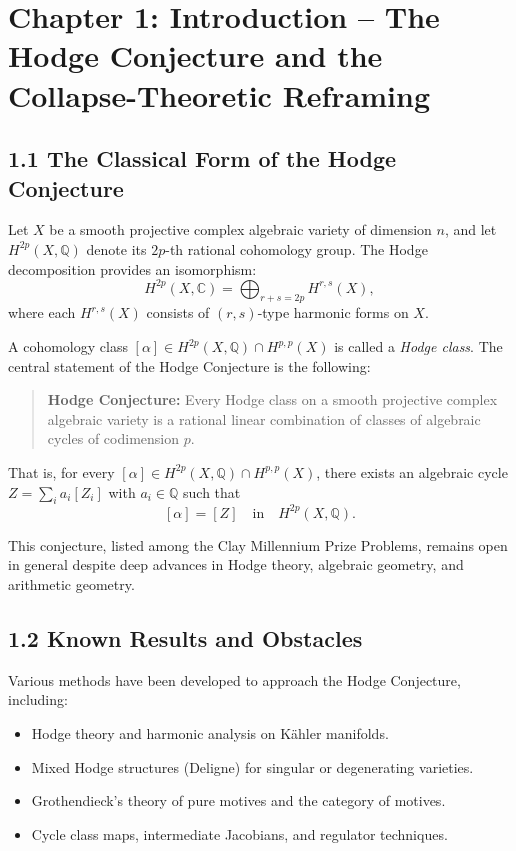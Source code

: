\documentclass[11pt]{article}
\begin{document}
\section{Chapter 1: Introduction – The Hodge Conjecture and the Collapse-Theoretic Reframing}

\subsection{1.1 The Classical Form of the Hodge Conjecture}

Let $X$ be a smooth projective complex algebraic variety of dimension $n$, and let $H^{2p}(X, \mathbb{Q})$ denote its $2p$-th rational cohomology group.  
The Hodge decomposition provides an isomorphism:
\[
H^{2p}(X, \mathbb{C}) = \bigoplus_{r+s=2p} H^{r,s}(X),
\]
where each $H^{r,s}(X)$ consists of $(r,s)$-type harmonic forms on $X$.

A cohomology class $[\alpha] \in H^{2p}(X, \mathbb{Q}) \cap H^{p,p}(X)$ is called a \emph{Hodge class}.  
The central statement of the Hodge Conjecture is the following:

\begin{quote}
\textbf{Hodge Conjecture:}  
Every Hodge class on a smooth projective complex algebraic variety is a rational linear combination of classes of algebraic cycles of codimension $p$.
\end{quote}

That is, for every $[\alpha] \in H^{2p}(X, \mathbb{Q}) \cap H^{p,p}(X)$, there exists an algebraic cycle $Z = \sum_i a_i [Z_i]$ with $a_i \in \mathbb{Q}$ such that
\[
[\alpha] = [Z] \quad \text{in} \quad H^{2p}(X, \mathbb{Q}).
\]

This conjecture, listed among the Clay Millennium Prize Problems, remains open in general despite deep advances in Hodge theory, algebraic geometry, and arithmetic geometry.

\subsection{1.2 Known Results and Obstacles}

Various methods have been developed to approach the Hodge Conjecture, including:

\begin{itemize}
  \item Hodge theory and harmonic analysis on Kähler manifolds.
  \item Mixed Hodge structures (Deligne) for singular or degenerating varieties.
  \item Grothendieck's theory of pure motives and the category of motives.
  \item Cycle class maps, intermediate Jacobians, and regulator techniques.
\end{itemize}
\end{document}
